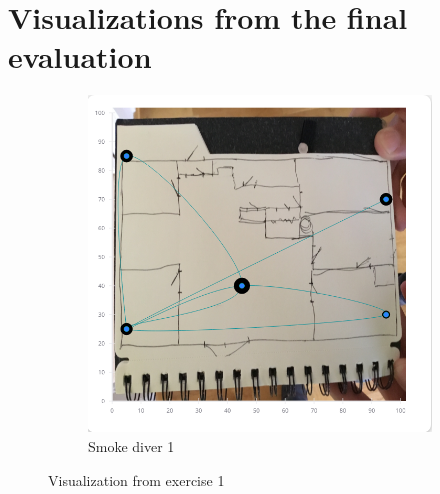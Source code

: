 \documentclass[../Main/thesis.tex]{subfiles}
\begin{document}
\chapter{Visualizations from the final evaluation}
\label{app:visualizations}

\begin{figure}[H]
	\centering
	\begin{subfigure}{0.7\textwidth}
		\includegraphics[width=\textwidth]{../fig/eval_1_remi}
		\caption{Smoke diver 1}
		\label{fig:eval-visualization-1-1-app}
	\end{subfigure}
	\caption{Visualization from exercise 1}
	\label{fig:eval-visualization-1-app}
\end{figure}
\end{document}
